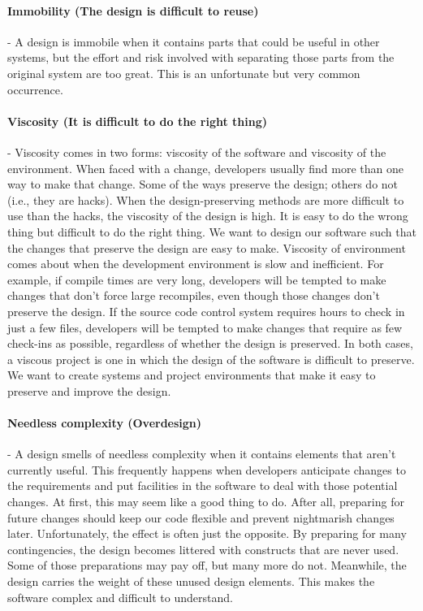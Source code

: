 \documentclass{llncs}
\begin{document}
\paragraph{Immobility (The design is difficult to reuse)} - A design is immobile when it contains parts that could be useful in other systems, but the effort and risk involved with separating those parts from the original system are too great.
This is an unfortunate but very common occurrence.

\paragraph{Viscosity (It is difficult to do the right thing)} - Viscosity comes in two forms: viscosity of the software and viscosity of the environment. 
When faced with a change, developers usually find more than one way to make that change.
Some of the ways preserve the design; others do not (i.e., they are hacks).
When the design-preserving methods are more difficult to use than the hacks, the viscosity of the design is high.
It is easy to do the wrong thing but difficult to do the right thing.
We want to design our software such that the changes that preserve the design are easy to make.
Viscosity of environment comes about when the development environment is slow and inefficient.
For example, if compile times are very long, developers will be tempted to make changes that don't force large recompiles, even though those changes don't preserve the design. 
If the source code control system requires hours to check in just a few files, developers will be tempted to make changes that require as few check-ins as possible, regardless of whether the design is preserved.
In both cases, a viscous project is one in which the design of the software is difficult to preserve. 
We want to create systems and project environments that make it easy to preserve and improve the
design.


\paragraph{Needless complexity (Overdesign)} - A design smells of needless complexity when it contains elements that aren't currently useful.
This frequently happens when developers anticipate changes to the requirements and put facilities in the software to deal with those potential changes. At first, this may seem like a good thing to do.
After all, preparing for future changes should keep our code flexible and prevent nightmarish changes later.
Unfortunately, the effect is often just the opposite. By preparing for many contingencies, the design becomes littered with constructs that are never used. Some of those preparations may pay off, but many more do not. 
Meanwhile, the design carries the weight of these unused design elements.
This makes the software complex and difficult to understand.
\end{document}
